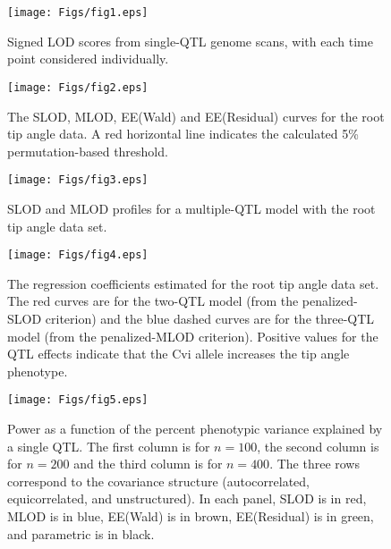 \documentclass[12pt,letterpaper]{article}
\begin{document}
\newpage


\begin{figure}[!ht]
\begin{center}
\texttt{[image: Figs/fig1.eps]}
\vspace{1cm}
 \caption{\label{lodimage1} Signed LOD scores from single-QTL genome
   scans, with each time point considered individually.}
\end{center}
\end{figure}





\newpage

\begin{figure}[!ht]
\begin{center}
\texttt{[image: Figs/fig2.eps]}
\vspace{1cm}
 \caption{\label{plod1} The SLOD, MLOD, EE(Wald) and EE(Residual)
     curves for the root tip angle data. A red
     horizontal line indicates the calculated 5\% permutation-based threshold.}
\end{center}
\end{figure}

\newpage

\begin{figure}[!ht]
\begin{center}
\texttt{[image: Figs/fig3.eps]}
\vspace{1cm}
 \caption{\label{pro1} SLOD and MLOD profiles for a multiple-QTL model
   with the root tip angle data set.}
\end{center}
\end{figure}


\newpage

\begin{figure}[!ht]
\begin{center}
\texttt{[image: Figs/fig4.eps]}
\vspace{1cm}
\caption{\label{fp1} The regression coefficients estimated for
    the root tip angle data set. The red curves are for the two-QTL
    model (from the penalized-SLOD criterion) and the blue dashed
    curves are for the three-QTL model (from the penalized-MLOD
    criterion). Positive values for the QTL effects indicate that the
    Cvi allele increases the tip angle phenotype.}
\end{center}
\end{figure}


\newpage

\begin{figure}[!ht]
\begin{center}
\texttt{[image: Figs/fig5.eps]}
\vspace{1cm}
\caption{\label{power1} Power as a function of the percent phenotypic
  variance explained by a single QTL. The first column is for $n=100$, the second column is for $n=200$ and the third column is for $n=400$. The three rows correspond to the
  covariance structure (autocorrelated, equicorrelated, and
  unstructured).  In each panel, SLOD is in red, MLOD is in blue,
  EE(Wald) is in brown, EE(Residual) is in green, and
  parametric is in black.}
\end{center}
\end{figure}
\end{document}
